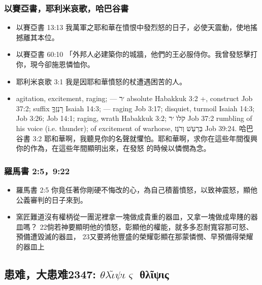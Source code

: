 \subsubsection{以賽亞書，耶利米哀歌，哈巴谷書}
\begin{itemize} 
\itemsep-.25em
\item 以賽亞書 13:13 我萬軍之耶和華在憤恨中發烈怒的日子，必使天震動，使地搖撼離其本位。
\item 以賽亞書 60:10 「外邦人必建築你的城牆，他們的王必服侍你。我曾發怒擊打你，現今卻施恩憐恤你。
\item 耶利米哀歌 3:1 我是因耶和華憤怒的杖遭遇困苦的人。
\item agitation, excitement, raging; — ׳ר absolute Habakkuk 3:2 +, construct Job 37:2; suffix רָנְזֶךָ֑ Isaiah 14:3; — raging Job 3:17; disquiet, turmoil Isaiah 14:3; Job 3:26; Job 14:1; raging, wrath Habakkuk 3:2; קֹלוֺ ׳ר Job 37:2 rumbling of his voice (i.e. thunder); of excitement of warhorse, בְּרַעַשׁ וְרֹגֶּז Job 39:24.
哈巴谷書 3:2 耶和華啊，我聽見你的名聲就懼怕。耶和華啊，求你在這些年間復興你的作為，在這些年間顯明出來，在發怒 的時候以憐憫為念。
\end{itemize}  


\subsubsection{羅馬書 2:5，9:22}
\begin{itemize} 
\itemsep-.25em
\item 羅馬書 2:5 你竟任著你剛硬不悔改的心，為自己積蓄憤怒，以致神震怒，顯他公義審判的日子來到。
\item 窯匠難道沒有權柄從一團泥裡拿一塊做成貴重的器皿，又拿一塊做成卑賤的器皿嗎？ 22倘若神要顯明他的憤怒，彰顯他的權能，就多多忍耐寬容那可怒、預備遭毀滅的器皿， 23又要將他豐盛的榮耀彰顯在那蒙憐憫、早預備得榮耀的器皿上
\end{itemize}  

\subsection{患难，大患难2347: $\theta$$\lambda$$\widetilde{\iota}$$\psi$$\iota$$\varsigma$ θλῖψις}



